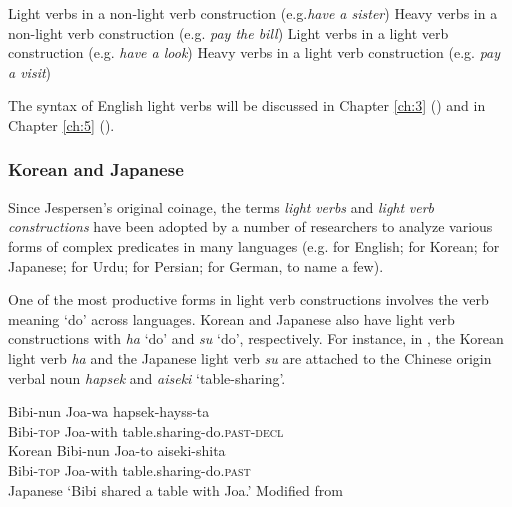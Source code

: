 \begin{exe} \ex \label{ex:29}
\begin{xlist}
    \ex Light verbs in a non-light verb construction	(e.g.\textit{have a sister})
    \ex Heavy verbs in a non-light verb construction	(e.g. \textit{pay the bill})
    \ex Light verbs in a light verb construction 	(e.g. \textit{have a look})
    \ex Heavy verbs in a light verb construction 	(e.g. \textit{pay a visit})
\end{xlist}
\end{exe}

The syntax of English light verbs will be discussed in Chapter \ref{ch:3} () and in Chapter \ref{ch:5} ().

\subsubsection{Korean and Japanese}\label{ch1:sect:KRJP}

Since Jespersen’s original coinage, the terms \textit{light} \textit{verbs} and \textit{light} \textit{verb} \textit{constructions} have been adopted by a number of researchers to analyze various forms of complex predicates in many languages (e.g. \citealt{Campbell1989,Cattell1984,Kearns1989} for English; \citealt{Ahn1991,ParkK1992} for Korean; \citealt{Dubinsky1997,GrimshawMester1988} for Japanese; \citealt{Butt1995,ButtGeuder2001} for Urdu; \citealt{KarimiDoostan1997} for Persian; \citealt{Wittenberg2016} for German, to name a few). 

One of the most productive forms in light verb constructions involves the verb meaning ‘do’ across languages. Korean and Japanese also have light verb constructions with \textit{ha} ‘do’ and \textit{su} ‘do’, respectively. For instance, in , the Korean light verb \textit{ha} and the Japanese light verb \textit{su} are attached to the Chinese origin verbal noun \textit{hapsek} and \textit{aiseki} ‘table-sharing’. 

\begin{exe}\ex\label{ex:30}
\begin{xlist}
\ex \gll Bibi-nun Joa-wa 	hapsek-hayss-ta	\\
Bibi-\textsc{top} Joa-with	table.sharing-do.\textsc{past}-\textsc{decl} \\
\hfill Korean
\ex \gll Bibi-nun Joa-to 	aiseki-shita \\
Bibi-\textsc{top} Joa-with	table.sharing-do.\textsc{past} \\
Japanese
\glt ‘Bibi shared a table with Joa.’	  Modified from \citet[(2)]{GrimshawMester1988}
\end{xlist}\end{exe}

